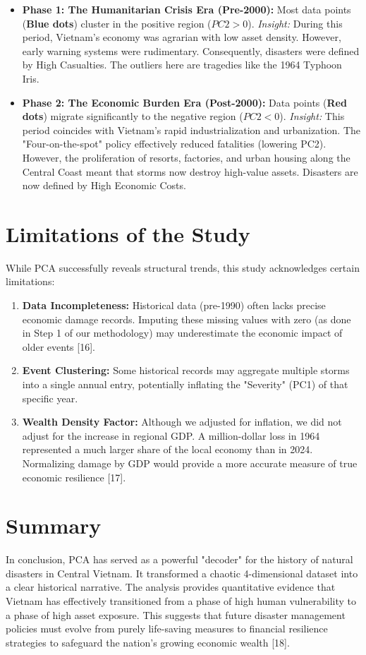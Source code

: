 \documentclass[12pt, a4paper]{report}
\begin{document}
\begin{itemize}
    \item \textbf{Phase 1: The Humanitarian Crisis Era (Pre-2000):} Most data points (\textbf{Blue dots}) cluster in the positive region ($PC2 > 0$).
    \textit{Insight:} During this period, Vietnam's economy was agrarian with low asset density. However, early warning systems were rudimentary. Consequently, disasters were defined by High Casualties. The outliers here are tragedies like the 1964 Typhoon Iris.
    
    \item \textbf{Phase 2: The Economic Burden Era (Post-2000):} Data points (\textbf{Red dots}) migrate significantly to the negative region ($PC2 < 0$).
    \textit{Insight:} This period coincides with Vietnam's rapid industrialization and urbanization. The "Four-on-the-spot" policy effectively reduced fatalities (lowering PC2). However, the proliferation of resorts, factories, and urban housing along the Central Coast meant that storms now destroy high-value assets. Disasters are now defined by High Economic Costs.
\end{itemize}

\section{Limitations of the Study}
While PCA successfully reveals structural trends, this study acknowledges certain limitations:
\begin{enumerate}
    \item \textbf{Data Incompleteness:} Historical data (pre-1990) often lacks precise economic damage records. Imputing these missing values with zero (as done in Step 1 of our methodology) may underestimate the economic impact of older events [16].
    \item \textbf{Event Clustering:} Some historical records may aggregate multiple storms into a single annual entry, potentially inflating the "Severity" (PC1) of that specific year.
    \item \textbf{Wealth Density Factor:} Although we adjusted for inflation, we did not adjust for the increase in regional GDP. A million-dollar loss in 1964 represented a much larger share of the local economy than in 2024. Normalizing damage by GDP would provide a more accurate measure of true economic resilience [17].
\end{enumerate}

\section{Summary}
In conclusion, PCA has served as a powerful "decoder" for the history of natural disasters in Central Vietnam. It transformed a chaotic 4-dimensional dataset into a clear historical narrative. The analysis provides quantitative evidence that Vietnam has effectively transitioned from a phase of high human vulnerability to a phase of high asset exposure. This suggests that future disaster management policies must evolve from purely life-saving measures to financial resilience strategies to safeguard the nation's growing economic wealth [18].
\end{document}
